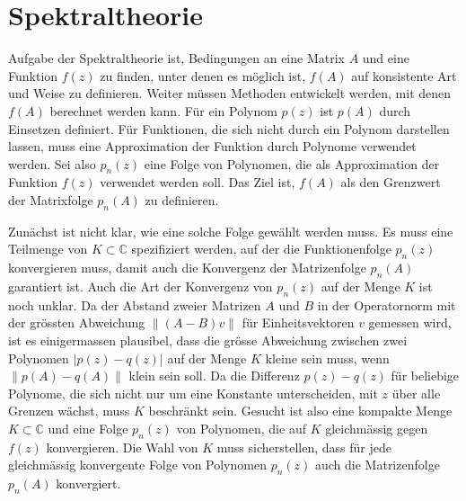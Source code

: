 %
%
% 
\section{Spektraltheorie
\label{buch:section:spektraltheorie}}
Aufgabe der Spektraltheorie ist, Bedingungen an eine Matrix $A$ und eine
Funktion $f(z)$ zu finden, unter denen es möglich ist, $f(A)$ auf 
konsistente Art und Weise zu definieren.
Weiter müssen Methoden entwickelt werden, mit denen $f(A)$ berechnet
werden kann.
Für ein Polynom $p(z)$ ist $p(A)$ durch Einsetzen definiert.
Für Funktionen, die sich nicht durch ein Polynom darstellen lassen,
muss eine Approximation der Funktion durch Polynome verwendet werden.
Sei also $p_n(z)$ eine Folge von Polynomen, die als Approximation der
Funktion $f(z)$ verwendet werden soll.
Das Ziel ist, $f(A)$ als den Grenzwert der Matrixfolge $p_n(A)$
zu definieren.

Zunächst ist nicht klar, wie eine solche Folge gewählt werden muss.
Es muss eine Teilmenge von $K\subset\mathbb{C}$ spezifiziert werden,
auf der die Funktionenfolge $p_n(z)$ konvergieren muss,
damit auch die Konvergenz der Matrizenfolge $p_n(A)$ garantiert ist.
Auch die Art der Konvergenz von $p_n(z)$ auf der Menge $K$ ist noch
unklar.
Da der Abstand zweier Matrizen $A$ und $B$ in der Operatornorm
mit der grössten Abweichung $\|(A-B)v\|$ für Einheitsvektoren $v$
gemessen wird, ist es einigermassen plausibel, dass
die grösse Abweichung zwischen zwei Polynomen $|p(z) - q(z)|$ auf
der Menge $K$ kleine sein muss, wenn $\|p(A)-q(A)\|$ klein 
sein soll.
Da die Differenz $p(z)-q(z)$ für beliebige Polynome, die sich nicht
nur um eine Konstante unterscheiden, mit $z$ über alle Grenzen wächst,
muss $K$ beschränkt sein.
Gesucht ist also eine kompakte Menge $K\subset\mathbb{C}$ und eine
Folge $p_n(z)$ von Polynomen, die auf $K$ gleichmässig gegen $f(z)$
konvergieren.
Die Wahl von $K$ muss sicherstellen, dass für jede gleichmässig
konvergente Folge von Polynomen $p_n(z)$ auch die Matrizenfolge
$p_n(A)$ konvergiert.

